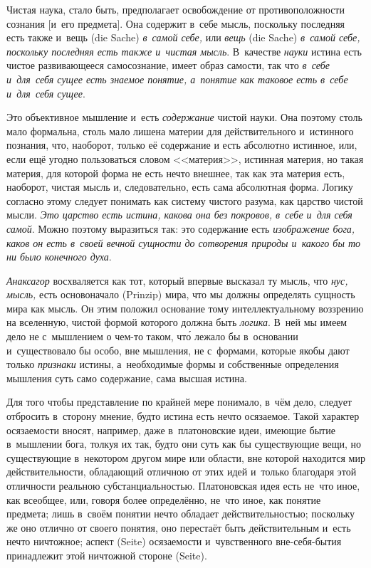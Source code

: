 Чистая наука, стало быть, предполагает освобождение от противоположности
сознания [и~его предмета]. Она содержит в~себе мысль, поскольку последняя
есть также и~вещь (die Sache) {\em в~самой себе,} или
{\em вещь} (die Sache) {\em в~самой себе, поскольку последняя есть также
и~чистая мысль}. В~качестве {\em науки} истина есть чистое развивающееся
самосознание, имеет образ самости, так что {\em в~себе и~для~себя сущее
есть знаемое понятие, а~понятие как таковое есть в~себе и~для~себя сущее}.

Это объективное мышление и~есть {\em содержание} чистой
науки. Она поэтому столь мало формальна, столь мало лишена материи для
действительного и~истинного познания, что, наоборот, только её содержание и
есть абсолютно истинное, или, если ещё угодно пользоваться словом
<<материя>>, истинная материя, но такая материя, для которой форма не есть
нечто внешнее, так как эта материя есть, наоборот, чистая мысль и,
следовательно, есть сама абсолютная форма. Логику согласно этому следует
понимать как систему чистого разума, как царство чистой мысли.
{\em Это царство есть истина, какова она без покровов,
в~себе и~для себя самой}. Можно поэтому выразиться так: это содержание есть
{\em изображение бога, каков он есть в~своей вечной
сущности до сотворения природы и~какого бы то ни было конечного духа}.

{\em Анаксагор} восхваляется как тот, который впервые
высказал ту мысль, что {\em нус,}
{\em мысль,} есть основоначало (Prinzip) мира, что мы
должны определять сущность мира как мысль. Он этим положил основание тому
интеллектуальному воззрению на вселенную, чистой формой которого должна
быть {\em логика}. В~ней мы имеем дело не с~мышлением о
чем-то таком, чт\'{о} лежало бы в~основании и~существовало бы особо, вне
мышления, не с~формами, которые якобы дают только
{\em признаки} истины, а~необходимые формы и
собственные определения мышления суть само содержание, сама высшая истина.

Для того чтобы представление по крайней мере понимало, в~чём дело, следует
отбросить в~сторону мнение, будто истина есть нечто осязаемое. Такой
характер осязаемости вносят, например, даже в~платоновские идеи, имеющие
бытие в~мышлении бога, толкуя их так, будто они суть как бы существующие
вещи, но существующие в~некотором другом мире или области, вне которой
находится мир действительности, обладающий отличною от этих идей и~только
благодаря этой отличности реальною субстанциальностью. Платоновская идея
есть не~что иное, как всеобщее, или, говоря более определённо, не~что иное,
как понятие предмета; лишь в~своём понятии нечто обладает
действительностью; поскольку же оно отлично от своего понятия, оно
перестаёт быть действительным и~есть нечто ничтожное; аспект (Seite)
осязаемости и~чувственного вне-себя-бытия принадлежит этой ничтожной
стороне (Seite).

